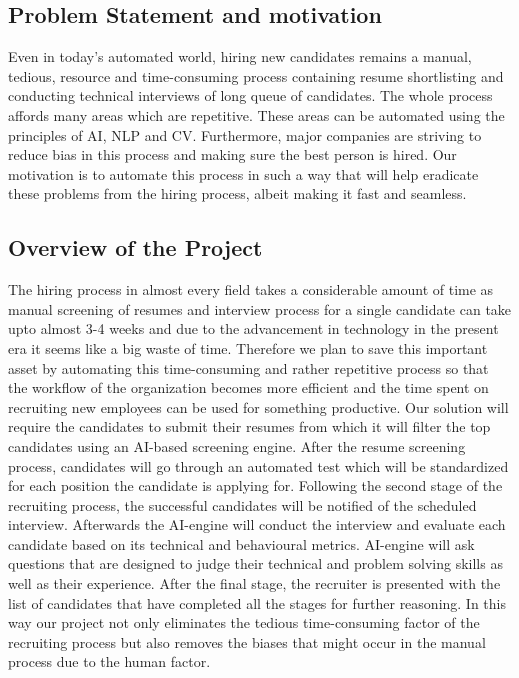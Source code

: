 \subsection{Problem Statement and motivation}
Even in today’s automated world, hiring new candidates remains a manual, tedious, resource and time-consuming process containing resume shortlisting and conducting technical interviews of long queue of candidates. The whole process affords many areas which are repetitive. These areas can be automated using the principles of AI, NLP and CV. Furthermore, major companies are striving to reduce bias in this process and making sure the best person is hired. Our motivation is to automate this process in such a way that will help eradicate these problems from the hiring process, albeit making it fast and seamless.

\subsection{Overview of the Project}
The hiring process in almost every field takes a considerable amount of time as manual screening of resumes and interview process for a single candidate can take upto almost 3-4 weeks\cite{hiringstatistics} and due to the advancement in technology in the present era it seems like a big waste of time. Therefore we plan to save this important asset by automating this time-consuming and rather repetitive  process so that the workflow of the organization becomes more efficient and the time spent on recruiting new employees can be used for something productive. Our solution will require the candidates to submit their resumes from which it will filter the top candidates using an AI-based screening engine. After the resume screening process, candidates will go through an automated test which will be standardized for each position the candidate is applying for. Following the second stage of the recruiting process, the successful candidates will be notified of the scheduled interview. Afterwards the AI-engine will conduct the interview and evaluate each candidate based on its technical and behavioural metrics. AI-engine will ask questions that are designed to judge their technical and problem solving skills as well as their experience. After the final stage, the recruiter is presented with the list of candidates that have completed all the stages for further reasoning. In this way our project not only eliminates the tedious time-consuming factor of the recruiting process but also removes the biases that might occur in the manual process due to the human factor.
